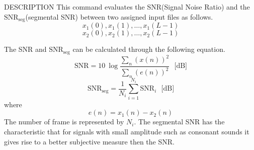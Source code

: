 \begin{qsection}{DESCRIPTION}
This command evaluates the SNR(Signal Noise Ratio) and
the $\mbox{SNR}_{\mbox{seg}}$(segmental SNR)
between two assigned input files as follows.
\begin{displaymath}
  x_1(0),x_1(1),\ldots,x_1(L-1)
\end{displaymath}
\begin{displaymath}
  x_2(0),x_2(1),\ldots,x_2(L-1)
\end{displaymath}
\par
The SNR and $\mbox{SNR}_{\mbox{seg}}$ can be calculated
through the following equation.
\begin{displaymath}
\mbox{SNR} = 10~\log \frac{\displaystyle\sum_{n} ( x(n) )^{2}}
{\displaystyle\sum_{n} (e(n))^{2}}~~~\mbox{[dB]}
\end{displaymath}
\begin{displaymath}
\mbox{SNR}_{\mbox{seg}} = \frac{1}{N_{i}} \sum_{i = 1}^{N_{i}}
\mbox{SNR}_{i} ~~~\mbox{[dB]}
\end{displaymath}
where
\begin{displaymath}
e(n) = x_1(n) - x_2(n)
\end{displaymath}
The number of frame is represented by $N_i$.
The segmental SNR has the characteristic that
for signals with small amplitude such as consonant sounds
it gives rise to a better
subjective measure then the SNR.
\end{qsection}

